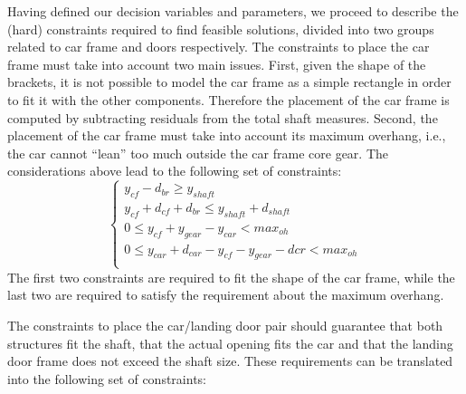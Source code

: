 Having defined our decision variables and parameters, we proceed to
describe the (hard) constraints required to find feasible solutions,
divided into two groups related to car frame and doors respectively.
The constraints to place the car frame must take into account two main
issues. First, given the shape of the brackets, it is not possible 
to model the car frame as a simple rectangle in order to fit it with
the other components. Therefore the placement of the car frame is
computed by subtracting residuals from the total shaft
measures. Second, the placement of the car frame must take into
account its maximum overhang, i.e., the car cannot ``lean'' too much
outside the car frame core gear. The considerations above lead
to the following set of constraints:
\begin{equation}
\begin{cases}
y_{cf} - d_{br} \geq y_{shaft} \\
y_{cf} + d_{cf} + d_{br} \leq y_{shaft} + d_{shaft} \\
0 \leq y_{cf} + y_{gear} - y_{car} < max_{oh} \\ 
0 \leq y_{car} + d_{car} - y_{cf} - y_{gear} - dcr < max_{oh} \\
\end{cases}
\label{eq:CFConstr}
\end{equation}
The first two constraints are required to fit the
shape of the car frame, while the last two are required to satisfy the
requirement about the maximum overhang.

The constraints to place the car/landing door pair should
guarantee that both structures fit the shaft, that the actual
opening fits the car and that the landing door frame does not exceed
the shaft size. These requirements can be translated into the
following set of constraints:

